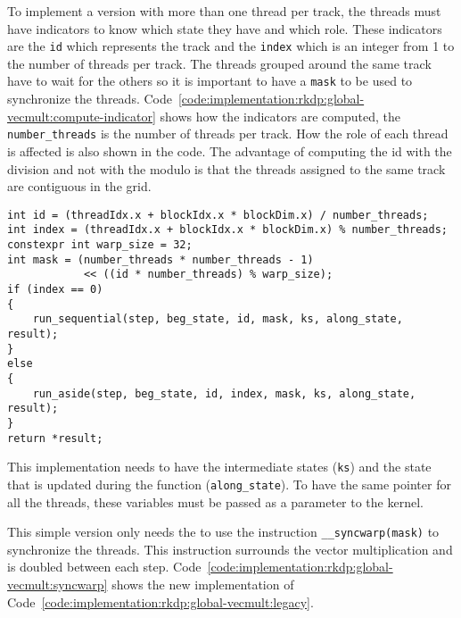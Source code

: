 To implement a version with more than one thread per track, the threads must
have indicators to know which state they have and which role.
These indicators are the \texttt{id} which represents the track and
the \texttt{index} which is an integer from 1 to the number of threads per track.
The threads grouped around the same track have to wait for the others so it is
important to have a \texttt{mask} to be used to synchronize the threads.
Code~\ref{code:implementation:rkdp:global-vecmult:compute-indicator} shows how
the indicators are computed, the \texttt{number\_threads} is the number of
threads per track.
How the role of each thread is affected is also shown in the code.
The advantage of computing the id with the division and not with the modulo is
that the threads assigned to the same track are contiguous in the grid.

\begin{code}
    \label{code:implementation:rkdp:global-vecmult:compute-indicator}
    \begin{verbatim}
int id = (threadIdx.x + blockIdx.x * blockDim.x) / number_threads;
int index = (threadIdx.x + blockIdx.x * blockDim.x) % number_threads;
constexpr int warp_size = 32;
int mask = (number_threads * number_threads - 1)
            << ((id * number_threads) % warp_size);
if (index == 0)
{
    run_sequential(step, beg_state, id, mask, ks, along_state, result);
}
else
{
    run_aside(step, beg_state, id, index, mask, ks, along_state, result);
}
return *result;
    \end{verbatim}
\end{code}

This implementation needs to have the intermediate states (\texttt{ks}) and the
state that is updated during the function (\texttt{along\_state}).
To have the same pointer for all the threads, these variables must be passed
as a parameter to the kernel.

This simple version only needs the to use the instruction \texttt{\_\_syncwarp(mask)}
to synchronize the threads.
This instruction surrounds the vector multiplication and is doubled between each
step.
Code~\ref{code:implementation:rkdp:global-vecmult:syncwarp} shows the new
implementation of Code~\ref{code:implementation:rkdp:global-vecmult:legacy}.

